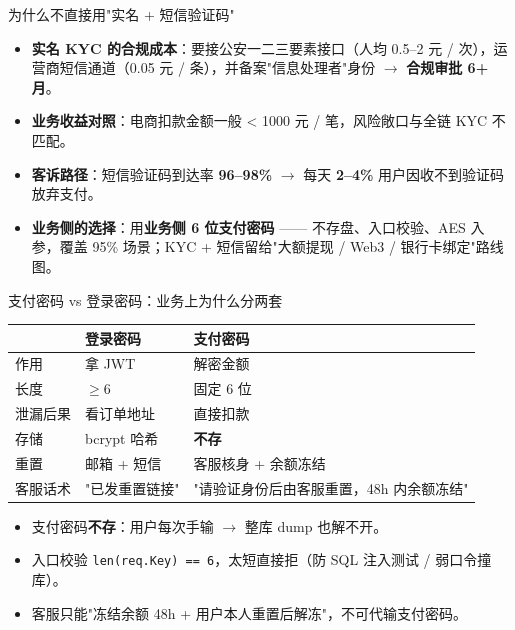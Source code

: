 \documentclass[aspectratio=169,11pt]{beamer}
\begin{document}
\begin{frame}[shrink]{为什么不直接用"实名 + 短信验证码"}
\begin{itemize}
  \item \textbf{实名 KYC 的合规成本}：要接公安一二三要素接口（人均 0.5--2 元 / 次），运营商短信通道（0.05 元 / 条），并备案"信息处理者"身份 $\to$ \textbf{合规审批 6+ 月}。
  \item \textbf{业务收益对照}：电商扣款金额一般 < 1000 元 / 笔，风险敞口与全链 KYC 不匹配。
  \item \textbf{客诉路径}：短信验证码到达率 \textbf{96--98\%} $\to$ 每天 \textbf{2--4\%} 用户因收不到验证码放弃支付。
  \item \textbf{业务侧的选择}：用\textbf{业务侧 6 位支付密码} —— 不存盘、入口校验、AES 入参，覆盖 95\% 场景；KYC + 短信留给"大额提现 / Web3 / 银行卡绑定"路线图。
\end{itemize}
\end{frame}

\begin{frame}[shrink]{支付密码 vs 登录密码：业务上为什么分两套}
\small
\begin{tabular}{@{}lll@{}}
\toprule
        & 登录密码     & 支付密码     \\
\midrule
作用    & 拿 JWT      & 解密金额     \\
长度    & $\geq 6$    & 固定 6 位    \\
泄漏后果 & 看订单地址  & 直接扣款     \\
存储    & bcrypt 哈希 & \textbf{不存}    \\
重置    & 邮箱 + 短信 & 客服核身 + 余额冻结 \\
客服话术 & "已发重置链接" & "请验证身份后由客服重置，48h 内余额冻结" \\
\bottomrule
\end{tabular}
\vspace{1mm}
\begin{itemize}\small
  \item 支付密码\textbf{不存}：用户每次手输 $\to$ 整库 dump 也解不开。
  \item 入口校验 \texttt{len(req.Key) == 6}，太短直接拒（防 SQL 注入测试 / 弱口令撞库）。
  \item 客服只能"冻结余额 48h + 用户本人重置后解冻"，不可代输支付密码。
\end{itemize}
\end{frame}
\end{document}

